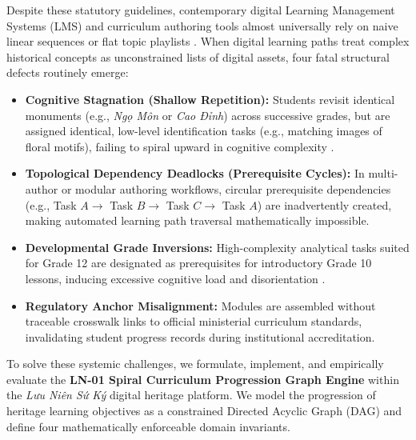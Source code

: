 \documentclass[11pt,a4paper]{article}
\begin{document}
Despite these statutory guidelines, contemporary digital Learning Management Systems (LMS) and curriculum authoring tools almost universally rely on naive linear sequences or flat topic playlists \cite{corbett1994knowledge, pelanek2017bayesian}. When digital learning paths treat complex historical concepts as unconstrained lists of digital assets, four fatal structural defects routinely emerge:
\begin{itemize}
    \item \textbf{Cognitive Stagnation (Shallow Repetition):} Students revisit identical monuments (e.g., \textit{Ngọ Môn} or \textit{Cao Đỉnh}) across successive grades, but are assigned identical, low-level identification tasks (e.g., matching images of floral motifs), failing to spiral upward in cognitive complexity \cite{bruner1960process, harden2000spiral}.
    \item \textbf{Topological Dependency Deadlocks (Prerequisite Cycles):} In multi-author or modular authoring workflows, circular prerequisite dependencies (e.g., Task $A \to$ Task $B \to$ Task $C \to$ Task $A$) are inadvertently created, making automated learning path traversal mathematically impossible.
    \item \textbf{Developmental Grade Inversions:} High-complexity analytical tasks suited for Grade 12 are designated as prerequisites for introductory Grade 10 lessons, inducing excessive cognitive load and disorientation \cite{sweller2011cognitive}.
    \item \textbf{Regulatory Anchor Misalignment:} Modules are assembled without traceable crosswalk links to official ministerial curriculum standards, invalidating student progress records during institutional accreditation.
\end{itemize}

To solve these systemic challenges, we formulate, implement, and empirically evaluate the \textbf{LN-01 Spiral Curriculum Progression Graph Engine} within the \textit{Lưu Niên Sứ Ký} digital heritage platform. We model the progression of heritage learning objectives as a constrained Directed Acyclic Graph (DAG) and define four mathematically enforceable domain invariants.
\end{document}

